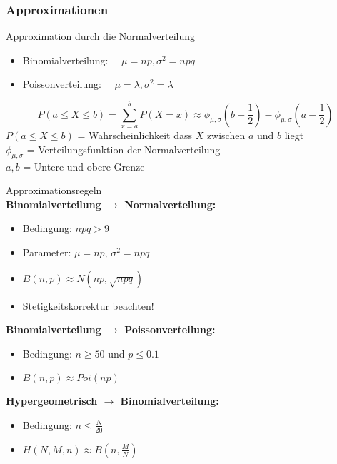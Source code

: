 \subsubsection{Approximationen}

\begin{concept}{Approximation durch die Normalverteilung}
\begin{itemize}
  \item Binomialverteilung: $\quad \mu=np, \sigma^2=npq$
  \item Poissonverteilung: $\quad \mu=\lambda, \sigma^2=\lambda$
\end{itemize}
$$
P(a \leq X \leq b)=\sum_{x=a}^{b} P(X=x) \approx \phi_{\mu,\sigma}(b+\frac{1}{2})-\phi_{\mu,\sigma}(a-\frac{1}{2})
$$
$P(a \leq X \leq b)$ = Wahrscheinlichkeit dass $X$ zwischen $a$ und $b$ liegt\\
$\phi_{\mu,\sigma}$ = Verteilungsfunktion der Normalverteilung\\
$a, b$ = Untere und obere Grenze\\
\end{concept}

\begin{theorem}{Approximationsregeln}\\
\textbf{Binomialverteilung $\rightarrow$ Normalverteilung:}
\begin{itemize}
    \item Bedingung: $npq > 9$
    \item Parameter: $\mu = np$, $\sigma^2 = npq$
    \item $B(n,p) \approx N(np, \sqrt{npq})$
    \item Stetigkeitskorrektur beachten!
\end{itemize}

\textbf{Binomialverteilung $\rightarrow$ Poissonverteilung:}
\begin{itemize}
    \item Bedingung: $n \geq 50$ und $p \leq 0.1$
    \item $B(n,p) \approx Poi(np)$
\end{itemize}

\textbf{Hypergeometrisch $\rightarrow$ Binomialverteilung:}
\begin{itemize}
    \item Bedingung: $n \leq \frac{N}{20}$
    \item $H(N,M,n) \approx B(n,\frac{M}{N})$
\end{itemize}
\end{theorem}

